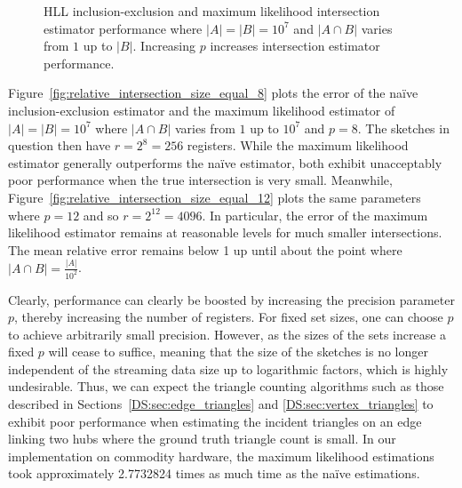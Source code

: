 \documentclass[10]{report}
\newcommand{\algoname}[1]{\textnormal{\textsc{#1}}}
\begin{document}
\begin{figure}
\begin{center}
		\caption{\algoname{HLL} inclusion-exclusion and maximum likelihood intersection estimator performance where $|A| = |B| = 10^7$ and $|A \cap B|$ varies from $1$ up to $|B|$.
			Increasing $p$ increases intersection estimator performance.
			\label{fig:relative_intersection_size_equal}}
	\end{center}
\end{figure}


Figure~\ref{fig:relative_intersection_size_equal_8} plots the error of the na\"ive inclusion-exclusion estimator and the maximum likelihood estimator of $|A| = |B| = 10^7$ where $|A \cap B|$ varies from $1$ up to $10^7$ and $p=8$.
The sketches in question then have $r = 2^8 = 256$ registers.
While the maximum likelihood estimator generally outperforms the na\"ive estimator, both exhibit unacceptably poor performance when the true intersection is very small. 
Meanwhile, Figure~\ref{fig:relative_intersection_size_equal_12} plots the same parameters where $p=12$ and so $r = 2^{12} = 4096$.
In particular, the error of the maximum likelihood estimator remains at reasonable levels for much smaller intersections.
The mean relative error remains below 1 up until about the point where $|A \cap B| = \frac{|A|}{10^2}$.

Clearly, performance can clearly be boosted by increasing the precision parameter $p$, thereby increasing the number of registers. 
For fixed set sizes, one can choose $p$ to achieve arbitrarily small precision. 
However, as the sizes of the sets increase a fixed $p$ will cease to suffice, meaning that the size of the sketches is no longer independent of the streaming data size up to logarithmic factors, which is highly undesirable.
Thus, we can expect the triangle counting algorithms such as those described in Sections~\ref{DS:sec:edge_triangles} and \ref{DS:sec:vertex_triangles} to exhibit poor performance when estimating the incident triangles on an edge linking two hubs where the ground truth triangle count is small.
In our implementation on commodity hardware, the maximum likelihood estimations took approximately 2.7732824 times as much time as the na\"ive estimations.
\end{document}
